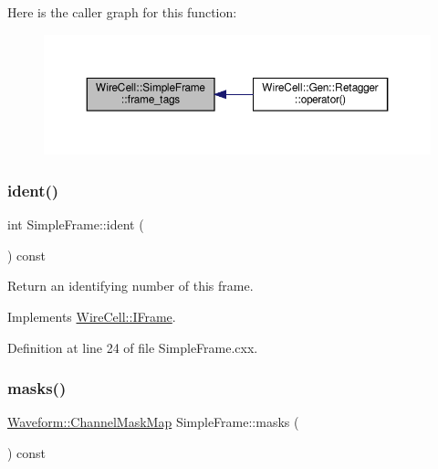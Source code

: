 Here is the caller graph for this function\+:
\nopagebreak
\begin{figure}[H]
\begin{center}
\leavevmode
\includegraphics[width=350pt]{class_wire_cell_1_1_simple_frame_ac52a4eab51683ef1b5bf746da3dcaec5_icgraph}
\end{center}
\end{figure}
\mbox{\label{class_wire_cell_1_1_simple_frame_a66da8e8ce7a801019b6457ebd2381f6c}} 
\subsubsection{\texorpdfstring{ident()}{ident()}}
{\footnotesize\ttfamily int Simple\+Frame\+::ident (\begin{DoxyParamCaption}{ }\end{DoxyParamCaption}) const\hspace{0.3cm}{\ttfamily [virtual]}}



Return an identifying number of this frame. 



Implements \hyperlink{class_wire_cell_1_1_i_frame_adbd5a27db1364bd8f5d89e1e7ca3c938}{Wire\+Cell\+::\+I\+Frame}.



Definition at line 24 of file Simple\+Frame.\+cxx.

\mbox{\label{class_wire_cell_1_1_simple_frame_a9261256f0f814b50120d6eabe2a13f0d}} 
\subsubsection{\texorpdfstring{masks()}{masks()}}
{\footnotesize\ttfamily \hyperlink{namespace_wire_cell_1_1_waveform_a18b9ae61c858e340252ba3ac83ac3bc0}{Waveform\+::\+Channel\+Mask\+Map} Simple\+Frame\+::masks (\begin{DoxyParamCaption}{ }\end{DoxyParamCaption}) const\hspace{0.3cm}{\ttfamily [virtual]}}




